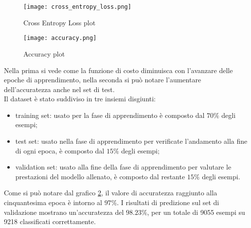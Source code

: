 \begin{figure}
    \centering
    \texttt{[image: cross\_entropy\_loss.png]}
    \caption{Cross Entropy Loss plot}
    \label{cross_entropy_loss_plot}
\end{figure}

\begin{figure}
    \centering
    \texttt{[image: accuracy.png]}
    \caption{Accuracy plot}
    \label{accuracy_plot}
\end{figure}
Nella prima si vede come la funzione di costo diminuisca con l'avanzare delle epoche di apprendimento, nella seconda si può notare l'aumentare dell'accuratezza anche nel set di test.\\
Il dataset è stato suddiviso in tre insiemi disgiunti:
\begin{itemize}
    \item training set: usato per la fase di apprendimento è composto dal $70\%$ degli esempi;
    \item test set: usato nella fase di apprendimento per verificate l'andamento alla fine di ogni epoca, è composto dal $15\%$ degli esempi;
    \item validation set: usato alla fine della fase di apprendimento per valutare le prestazioni del modello allenato, è composto dal restante $15\%$ degli esempi.
\end{itemize}
Come si può notare dal grafico \ref*{accuracy_plot}, il valore di accuratezza raggiunto alla cinquantesima epoca è intorno al $97\%$. I risultati di predizione sul set di validazione mostrano un'accuratezza del $98.23\%$, per un totale di 9055 esempi su 9218 classificati correttamente.
